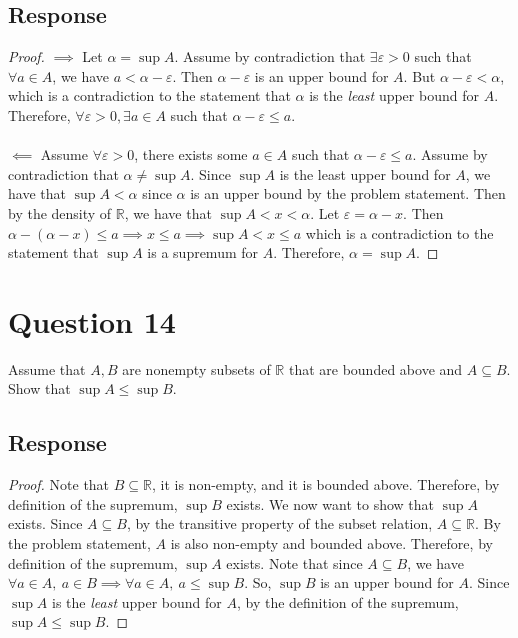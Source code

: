 \documentclass[13pt]{article}
\begin{document}
\subsection*{Response}
\begin{proof}
  $\implies$ Let $\alpha = \sup{A}$. Assume by contradiction that $\exists \varepsilon > 0$ such that $\forall a \in
  A$, we have $a < \alpha - \varepsilon$. Then $\alpha - \varepsilon$ is an upper bound for $A$. But $\alpha
  - \varepsilon < \alpha$, which is a contradiction to the statement that $\alpha$ is the \textit{least} upper bound
  for $A$. Therefore, $\forall \varepsilon > 0, \exists a \in A$ such that $\alpha - \varepsilon \leq a$. \\ \\
  $\impliedby$ Assume $\forall \varepsilon > 0$, there exists some $a \in A$ such that $\alpha - \varepsilon \leq a$.
  Assume by contradiction that $\alpha \neq \sup{A}$. Since $\sup{A}$ is the least upper bound for $A$, we have that
  $\sup{A} < \alpha$ since $\alpha$ is an upper bound by the problem statement. Then by the density of $\mathbb{R}$,
  we have that $\sup{A} < x < \alpha$. Let $\varepsilon = \alpha - x$. Then $\alpha - (\alpha - x) \leq a
  \implies x \leq a \implies \sup{A} < x \leq a$ which is a contradiction to the statement that $\sup{A}$ is a
  supremum for $A$. Therefore, $\alpha = \sup{A}$.  
\end{proof}

\newpage
\section*{Question 14}
Assume that $A, B$ are nonempty subsets of $\mathbb{R}$ that are bounded above and $A \subseteq
B$. Show that $\sup{A} \leq \sup{B}$.
\subsection*{Response}
\begin{proof}
  Note that $B \subseteq \mathbb{R}$, it is non-empty, and it is bounded above. Therefore, by definition of
  the supremum, $\sup{B}$ exists. We now want to show that $\sup{A}$ exists. Since $A \subseteq B$, by the
  transitive property of the subset relation, $A \subseteq \mathbb{R}$. By the problem statement, $A$ is also
  non-empty and bounded above. Therefore, by definition of the supremum, $\sup{A}$ exists. Note that since
  $A \subseteq B$, we have $\forall a \in A, \ a \in B \implies \forall a \in A, \ a \leq \sup{B}$. So, $\sup{B}$ is
  an upper bound for $A$. Since $\sup{A}$ is the \textit{least} upper bound for $A$, by the definition of the supremum,
  $\sup{A} \leq \sup{B}$.
\end{proof}
\end{document}
